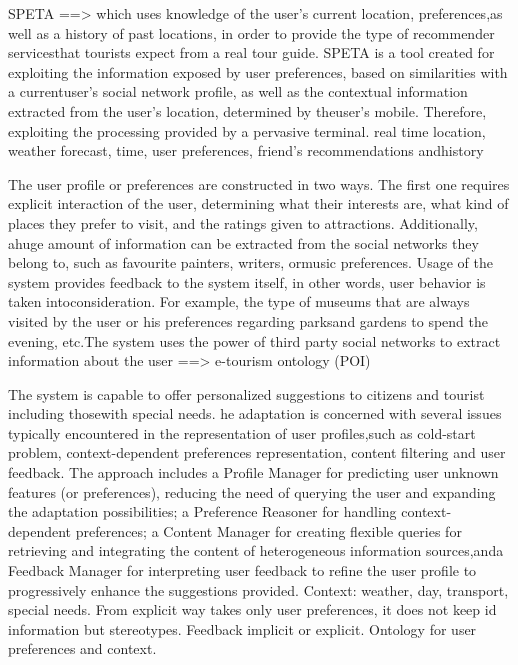 \cite{garcia2009speta} SPETA ==> which uses knowledge of the user’s current location, preferences,as well as a history of past locations, in order to provide the type of recommender servicesthat tourists expect from a real tour guide. SPETA is a tool created for exploiting the information exposed by user preferences, based on similarities with a currentuser’s social network profile, as well as the contextual information extracted from the user’s location, determined by theuser’s mobile. Therefore, exploiting the processing provided by a pervasive terminal.
real time location, weather forecast, time, user preferences, friend’s recommendations andhistory

The user profile or preferences are constructed in two ways. The first one requires explicit interaction of the user, determining what their interests are, what kind of places they prefer to visit, and the ratings given to attractions. Additionally, ahuge amount of information can be extracted from the social networks they belong to, such as favourite painters, writers, ormusic preferences. Usage of the system provides feedback to the system itself, in other words, user behavior is taken intoconsideration. For example, the type of museums that are always visited by the user or his preferences regarding parksand gardens to spend the evening, etc.The system uses the power of third party social networks to extract information about the user ==> e-tourism ontology (POI)


\cite{alonso2012ontology}  The  system  is  capable  to offer personalized  suggestions to  citizens  and tourist including thosewith  special  needs. he  adaptation  is  concerned  with  several  issues typically  encountered  in  the  representation  of  user  profiles,such   as   cold-start   problem,   context-dependent   preferences representation,   content   filtering   and   user   feedback.   The approach   includes   a   Profile   Manager   for   predicting   user unknown   features   (or   preferences),   reducing   the   need   of querying the  user and expanding the  adaptation possibilities; a Preference Reasoner for handling context-dependent preferences; a Content Manager for creating flexible queries for retrieving and   integrating   the   content   of   heterogeneous information  sources,anda  Feedback  Manager  for interpreting user   feedback   to   refine   the   user   profile   to   progressively enhance the suggestions provided. Context: weather, day, transport, special needs. From explicit way takes only user preferences, it does not keep id information but stereotypes. Feedback implicit or explicit.
Ontology for user preferences and context.


